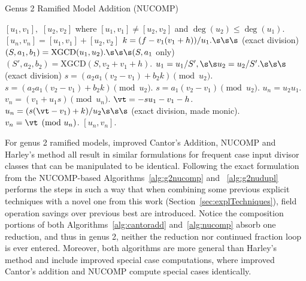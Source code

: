 \begin{algorithm}[htbp]
\caption{Genus 2 Ramified Model Addition (NUCOMP)}
\label{alg:g2nucomp}
\begin{algorithmic}[1]
\Require $[u_1,v_1],$ $[u_2,v_2]$ where $[u_1,v_1] \neq [u_2,v_2]$ and $\deg(u_2) \leq \deg(u_1)$.
\Ensure $[u_n,v_n] = [u_1,v_1] + [u_2,v_2]$
\State $k = (f - v_1(v_1 + h))/u_1. \s\s\s$ (exact division)
\State $(S,a_1,b_1) = \mathrm{XGCD}(u_1,u_2). \s\s\s  (S, a_1$ only)
    \State $(S',a_2,b_2) = \mathrm{XGCD}(S,v_2 + v_1 + h)$.
        \State $u_1 = u_1/S', \s\s u_2 = u_2/S'. \s\s\s$ (exact division)
        \State $s = (a_2a_1(v_2 - v_1) + b_2k) \pmod{u_2}$.
    \Else
        \State $s = (a_2a_1(v_2 - v_1) + b_2k) \pmod{u_2}$.
    \EndIf
\Else
    \State $ s = a_1(v_2 - v_1) \pmod{u_2}$.
\EndIf
{}
    \State $u_n = u_2u_1$.
    \State $v_n = (v_1 + u_1s) \pmod{u_n}$.
\Else   
    \State $\vt = -su_1 - v_1 - h$.
    \State $u_n = (s(\vt - v_1) + k)/u_2 \s\s\s$ (exact division, made monic).
    \State $v_n = \vt \pmod{u_n}$.
\EndIf
\State \Return $[u_n,v_n]$.
\end{algorithmic}
\end{algorithm}

For genus 2 ramified models, improved Cantor's Addition, NUCOMP and
Harley's method all result in similar formulations for frequent case input
divisor classes that can be manipulated to be identical. Following the exact
formulation from the NUCOMP-based Algorithms~\ref{alg:g2nucomp} and
~\ref{alg:g2nudupl} performs the steps in such a way that when combining some
previous explicit techniques with a novel one from this work
(Section~\ref{sec:explTechniques}), field operation savings over previous best
are introduced. Notice the composition portions of both
Algorithms~\ref{alg:cantoradd} and~\ref{alg:nucomp} absorb one reduction, and
thus in genus 2, neither the reduction nor continued fraction loop is ever
entered. Moreover, both algorithms are more general than Harley's method and
include improved special case computations, where improved Cantor's addition and
NUCOMP compute special cases identically. 

